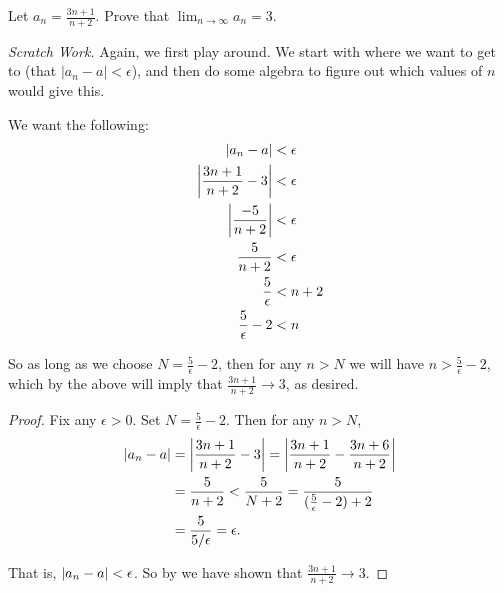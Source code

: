 \begin{example}
  Let $a_n = \frac{3n+1}{n+2}$. Prove that $\lim_{n\to\infty} a_n = 3$.

  \textit{Scratch Work.} Again, we first play around. We start with
  where we want to get to (that $|a_n - a| < \epsilon$), and then
  do some algebra to figure out which values of $n$ would give this.

  We want the following:
  \begin{align*}
    | a_n - a | &< \epsilon\\
    \left|\frac{3n+1}{n+2} - 3\right| &< \epsilon\\
    \left|\frac{-5}{n+2}\right| &< \epsilon\\
    \frac{5}{n+2} &< \epsilon\\
    \frac{5}{\epsilon} &< n+2\\
    \frac{5}{\epsilon} - 2 &< n
  \end{align*}

  So as long as we choose $N = \frac{5}{\epsilon} - 2$, then for
  any $n > N$ we will have $n > \frac{5}{\epsilon} - 2$, which by
  the above will imply that $\frac{3n+1}{n+2} \to 3$, as desired.

  \begin{proof}
    Fix any $\epsilon > 0$. Set $N = \frac{5}{\epsilon} - 2$.
    Then for any $n > N$,
    \begin{align*}
      | a_n - a | &= \left|\frac{3n+1}{n+2} - 3\right| =
      \left|\frac{3n+1}{n+2} - \frac{3n+6}{n+2}\right|\\
      &= \frac{5}{n+2} < \frac{5}{N+2} =
      \frac{5}{(\frac{5}{\epsilon} - 2) + 2}\\
      &= \frac{5}{5/\epsilon} = \epsilon.
    \end{align*}

    That is, $| a_n - a | < \epsilon$. So by
     we have
    shown that $\frac{3n+1}{n+2} \to 3$.
  \end{proof}
\end{example}

